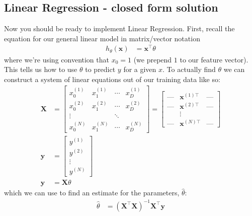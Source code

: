 \documentclass{article} %
\begin{document}
\subsection*{Linear Regression - closed form solution}
Now you should be ready to implement Linear Regression. First, recall the equation for our general linear model in 
matrix/vector notation
\begin{align*}
	h_\theta(\mathbf{x}) &= \mathbf{x}^\top \theta 
\end{align*}
%
where we're using convention that \(x_0 = 1\) (we prepend \(1\) to our feature vector). This tells us how to use \(\theta\) 
to predict \(y\) for a given \(x\). To actually find \(\theta\) we can construct a system of linear equations out of our 
training data like so: 
\begin{align*}
	\mathbf{X} &= \left[\begin{array}{cccc} x^{(1)}_0 & x^{(1)}_1 & \cdots & x^{(1)}_D\\ x^{(2)}_0 & x^{(2)}_1 & \cdots & x^{(2)}_D\\ \vdots & & \ddots & \\ x^{(N)}_0 & x^{(N)}_1 & \cdots & x^{(N)}_D\end{array}\right] = \left[\begin{array}{ccc}\text{---}&\mathbf{x}^{(1)\top}&\text{---}\\ \text{---}&\mathbf{x}^{(2)\top}&\text{---}\\ &\vdots&\\\text{---}&\mathbf{x}^{(N)\top}&\text{---}\end{array}\right]\\
	\mathbf{y} &= \left[\begin{array}{c}y^{(1)}\\ y^{(2)}\\ \vdots\\ y^{(N)} \end{array}\right]\\
	\mathbf{y} &= \mathbf{X} \theta
\end{align*}
%
which we can use to find an estimate for the parameters, \(\hat{\theta}\):
\begin{align}
	\hat{\theta} &= \left(\mathbf{X}^\top \mathbf{X}\right)^{-1} \mathbf{X}^\top \mathbf{y} \label{eqn:closed-form}
\end{align}
\end{document}
